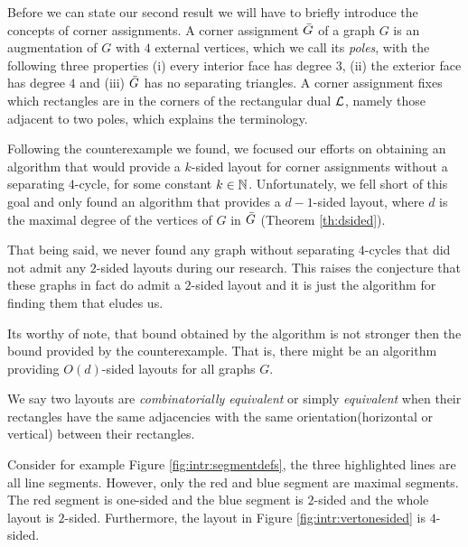 
  Before we can state our second result we will have to briefly introduce the concepts of corner assignments.
  A corner assignment $\bar{G}$ of a graph $G$ is an augmentation of $G$ with $4$ external vertices, which we call its \emph{poles}, with the following three properties (i) every interior face has degree $3$, (ii) the exterior face has degree $4$ and (iii) $\bar{G}$ has no separating triangles.
  A corner assignment fixes which rectangles are in the corners of the rectangular dual $\mathcal{L}$, namely those adjacent to two poles, which explains the terminology.

  Following the counterexample we found, we focused our efforts on obtaining an algorithm that would provide a $k$-sided layout for corner assignments without a separating $4$-cycle, for some constant $k \in \mathbb{N}$.
  Unfortunately, we fell short of this goal and only found an algorithm that provides a $d-1$-sided layout, where $d$ is the maximal degree of the vertices of $G$ in $\bar{G}$ (Theorem \ref{th:dsided}).

  That being said, we never found any graph without separating $4$-cycles that did not admit any $2$-sided layouts during our research.
  This raises the conjecture that these graphs in fact do admit a $2$-sided layout and it is just the algorithm for finding them that eludes us.

  Its worthy of note, that bound obtained by the algorithm is not stronger then the bound provided by the counterexample. That is, there might be an algorithm providing $O(d)$-sided layouts for all graphs $G$.

  We say two layouts are  \emph{combinatorially equivalent} or simply \emph{equivalent} when their rectangles have the same adjacencies with the same orientation(horizontal or vertical) between their rectangles. 

  Consider for example Figure \ref{fig:intr:segmentdefs}, the three highlighted lines are all line segments. However, only the red and blue segment are maximal segments. The red segment is one-sided and the blue segment is $2$-sided and the whole layout is $2$-sided. Furthermore, the layout in Figure \ref{fig:intr:vertonesided} is $4$-sided.

